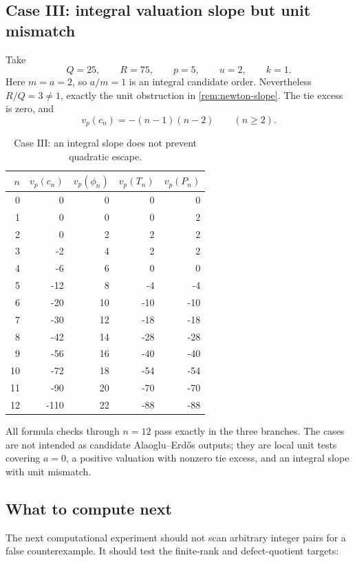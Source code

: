 \documentclass[11pt,oneside]{article}
\theoremstyle{definition}
\newcommand{\vp}{v_p}
\newcommand{\AEconj}{Alaoglu--Erd\H{o}s}
\begin{document}
\subsection{Case III: integral valuation slope but unit mismatch}

Take
\[
 Q=25,\qquad R=75,\qquad p=5,\qquad u=2,\qquad k=1.
\]
Here $m=a=2$, so $a/m=1$ is an integral candidate order.  Nevertheless
$R/Q=3\ne1$, exactly the unit obstruction in \cref{rem:newton-slope}.  The tie excess is zero,
and
\[
 \vp(c_n)=-(n-1)(n-2)\qquad(n\ge2).
\]

\begin{table}[H]
\centering
\caption{Case III: an integral slope does not prevent quadratic escape.}
\label{tab:case3}
\begin{tabular}{r@{\qquad}r@{\qquad}r@{\qquad}r@{\qquad}r}
\toprule
$n$ & $\vp(c_n)$ & $\vp(\phi_n)$ & $\vp(T_n)$ & $\vp(P_n)$\\
\midrule
0&0&0&0&0\\
1&0&0&0&2\\
2&0&2&2&2\\
3&-2&4&2&2\\
4&-6&6&0&0\\
5&-12&8&-4&-4\\
6&-20&10&-10&-10\\
7&-30&12&-18&-18\\
8&-42&14&-28&-28\\
9&-56&16&-40&-40\\
10&-72&18&-54&-54\\
11&-90&20&-70&-70\\
12&-110&22&-88&-88\\
\bottomrule
\end{tabular}
\end{table}

All formula checks through $n=12$ pass exactly in the three branches.  The cases are not
intended as candidate \AEconj{} outputs; they are local unit tests covering $a=0$, a positive
valuation with nonzero tie excess, and an integral slope with unit mismatch.

\subsection{What to compute next}

The next computational experiment should not scan arbitrary integer pairs for a false
counterexample.  It should test the finite-rank and defect-quotient targets:
\end{document}
